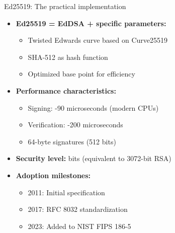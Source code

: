 \documentclass[aspectratio=169, lualatex, handout]{beamer}
\begin{document}
\begin{frame}{Ed25519: The practical implementation}
	\begin{itemize}
		\item \textbf{Ed25519 = EdDSA + specific parameters:}
		      \begin{itemize}
			      \item Twisted Edwards curve based on Curve25519
			      \item SHA-512 as hash function
			      \item Optimized base point for efficiency
		      \end{itemize}
		\item \textbf{Performance characteristics:}
		      \begin{itemize}
			      \item Signing: -90 microseconds (modern CPUs)
			      \item Verification: -200 microseconds
			      \item 64-byte signatures (512 bits)
		      \end{itemize}
		\item \textbf{Security level:}  bits (equivalent to 3072-bit RSA)
		\item \textbf{Adoption milestones:}
		      \begin{itemize}
			      \item 2011: Initial specification
			      \item 2017: RFC 8032 standardization
			      \item 2023: Added to NIST FIPS 186-5
		      \end{itemize}
	\end{itemize}
\end{frame}
\end{document}
